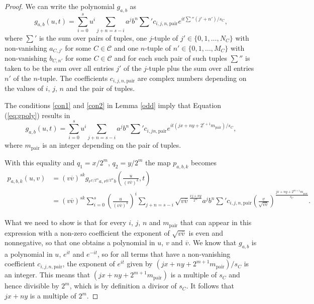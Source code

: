 \documentclass[notitlepage,12pt]{revtex4-1}
\begin{document}
\begin{proof}

We can write the polynomial $g_{a,b}$ as 
\begin{equation}
\label{eq:gpoly}
g_{a,b}(u,t)=\sum_{i=0}^{s}u^{i}\sum_{j+n=s-i}a^{j}b^{n}\sum'c_{i,j,n, \mathrm{pair}}e^{it\sum''(j'+n')/s_{C}},
\end{equation}
where $\sum'$ is the sum over pairs of tuples, one $j$-tuple of $j'\in\{0,1,\ldots,N_{C}\}$ with non-vanishing $a_{C,j'}$ for some $C\in\mathcal{C}$ and one $n$-tuple of $n'\in\{0,1,\ldots,M_{C}\}$ with non-vanishing $b_{C,n'}$ for some $C\in\mathcal{C}$ and for each such pair of such tuples $\sum''$ is taken to be the sum over all entries $j'$ of the $j$-tuple plus the sum over all entries $n'$ of the $n$-tuple. The coefficients $c_{i,j,n,\mathrm{pair}}$ are complex numbers depending on the values of $i$, $j$, $n$ and the pair of tuples.

The conditions \ref{con1} and \ref{con2} in Lemma \ref{odd} imply that Equation (\ref{eq:gpoly}) results in
\begin{equation}
g_{a,b}(u,t)=\sum_{i=0}^{s}u^{i}\sum_{j+n=s-i}a^{j}b^{n}\sum'c_{i,jn, \mathrm{pair}}e^{it(jx+ny+2^{r+1}m_{\mathrm{pair}})/s_{C}},
\end{equation}
where $m_{\mathrm{pair}}$ is an integer depending on the pair of tuples.

With this equality and $q_{1}=x/2^m$, $q_{2}=y/2^m$ the map $p_{a,b,k}$ becomes 
\begin{align}
\label{eq:ftilde}
p_{a,b,k}(u,v)&=(v\overline{v})^{sk}g_{r^{x/2^m}a,r^{y/2^m}b}\left(\frac{u}{(v\overline{v})^k},t\right)\nonumber \\ &=(v\overline{v})^{sk}\sum_{i=0}^{s}\left(\frac{u}{(v\overline{v})^{k}}\right)^{i}\sum_{j+n=s-i}\sqrt{v\overline{v}}^{\frac{xj+ny}{2^{m}}}a^j b^n \sum'c_{i,j,n,\mathrm{pair}}\left(\frac{v}{\sqrt{v\overline{v}}}\right)^{\frac{jx+ny+2^{m+1}m_{\mathrm{pair}}}{s_{C}}}.
\end{align}

What we need to show is that for every $i$, $j$, $n$ and $m_{\mathrm{pair}}$ that can appear in this expression with a non-zero coefficient the exponent of $\sqrt{v\overline{v}}$ is even and nonnegative, so that one obtains a polynomial in $u$, $v$ and $\overline{v}$. We know that $g_{a,b}$ is a polynomial in $u$, $e^{it}$ and $e^{-it}$, so for all terms that have a non-vanishing coefficient $c_{i,j,n,\mathrm{pair}}$, the exponent of $e^{it}$ given by $(jx+ny+2^{m+1}m_{\mathrm{pair}})/s_{C}$ is an integer.
This means that $(jx+ny+2^{m+1}m_{\mathrm{pair}})$ is a multiple of $s_{C}$ and hence divisible by $2^{m}$, which is by definition a divisor of $s_{C}$. It follows that $jx+ny$ is a multiple of $2^{m}$.


\end{proof}
\end{document}
